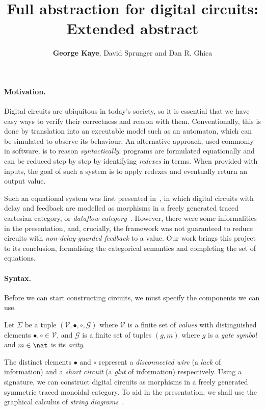 \documentclass[10pt]{article}
\title{\vspace{-3em}Full abstraction for digital circuits: \textbf{Extended abstract}}
\author{\textbf{George Kaye}, David Sprunger and Dan R. Ghica}
\begin{document}
    \maketitle

    \paragraph*{Motivation.}
    Digital circuits are ubiquitous in today's society, so it is essential that we have easy ways to verify their correctness and reason with them.
    Conventionally, this is done by translation into an executable model such as an automaton, which can be simulated to observe its behaviour.
    An alternative approach, used commonly in software, is to reason \emph{syntactically}: programs are formulated equationally and can be reduced step by step by identifying \emph{redexes} in terms.
    When provided with inputs, the goal of such a system is to apply redexes and eventually return an output value.

    Such an equational system was first presented in~\cite{ghica2016categorical,ghica2017diagrammatic}, in which digital circuits with delay and feedback are modelled as morphisms in a freely generated traced cartesian category, or \emph{dataflow category}~\cite{cazanescu1990new,cazanescu1994feedback}.
    However, there were some informalities in the presentation, and, crucially, the framework was not guaranteed to reduce circuits with \emph{non-delay-guarded feedback} to a value.
    Our work brings this project to its conclusion, formalising the categorical semantics and completing the set of equations.

    \paragraph*{Syntax.}
    Before we can start constructing circuits, we must specify the components we can use.

    \begin{definition}
        Let \(\Sigma\) be a tuple \((\mathcal{V},\bullet,\circ,\mathcal{G})\) where \(\mathcal{V}\) is a finite set of \emph{values} with distinguished elements \(\bullet,\circ \in \mathcal{V}\), and \(\mathcal{G}\) is a finite set of tuples \((g,m)\) where \(g\) is a \emph{gate symbol} and \(m \in \nat\) is its \emph{arity}.
    \end{definition}

    \noindent
    The distinct elements \(\bullet\) and \(\circ\) represent a \emph{disconnected wire} (a \emph{lack} of information) and a \emph{short circuit} (a \emph{glut} of information) respectively.
    Using a signature, we can construct digital circuits as morphisms in a freely generated symmetric traced monoidal category.
    To aid in the presentation, we shall use the graphical calculus of \emph{string diagrams}~\cite{joyal1991geometry,joyal1996traced,selinger2011survey}.
\end{document}
